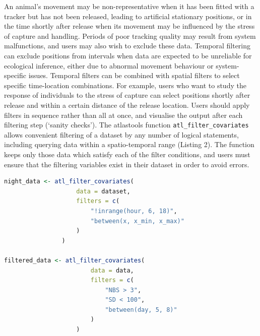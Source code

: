 \documentclass[10pt,paper=a4,headings=standardclasses
]{scrartcl}
\begin{document}
An animal’s movement may be non-representative when it has been fitted with a tracker but has not been released, leading to artificial stationary positions, or in the time shortly after release when its movement may be influenced by the stress of capture and handling.
Periods of poor tracking quality may result from system malfunctions, and users may also wish to exclude these data.
Temporal filtering can exclude positions from intervals when data are expected to be unreliable for ecological inference, either due to abnormal movement behaviour or system-specific issues.  
Temporal filters can be combined with spatial filters to select specific time-location combinations. 
For example, users who want to study the response of individuals to the stress of capture can select positions shortly after release and within a certain distance of the release location.
Users should apply filters in sequence rather than all at once, and visualise the output after each filtering step (`sanity checks').
The atlastools function \texttt{atl\_filter\_covariates} allows convenient filtering of a dataset by any number of logical statements, including querying data within a spatio-temporal range (Listing 2).
The function keeps only those data which satisfy each of the filter conditions, and users must ensure that the filtering variables exist in their dataset in order to avoid errors.

\begin{lstlisting}[float, language=R, style=customR, caption = {
    Data can be filtered by a temporal or a spatio-temporal range using \texttt{atl\_filter\_covariates}. 
    Filter conditions are passed to the \texttt{filters} argument as a character vector. 
    Only rows in the data satisfying \textit{all} the conditions are retained. 
    Here, the first example shows how nighttime data can be retained using a predicate that determines whether the value of `hour' is between 6 and 18, and also within a range of X coordinates.
    The second example retains ATLAS locations calculated using $>$ 3 base stations (\texttt{NBS}), with location-error (\texttt{SD}) $<$ 100, and data between an arbitrary day 5 and day 8.
    }]
night_data <- atl_filter_covariates(
                    data = dataset,
                    filters = c(
                        "!inrange(hour, 6, 18)",
                        "between(x, x_min, x_max)"
                    )
                )

filtered_data <- atl_filter_covariates(
                        data = data,
                        filters = c(
                            "NBS > 3",
                            "SD < 100",
                            "between(day, 5, 8)"
                        )
                    )                            
\end{lstlisting}
\end{document}
